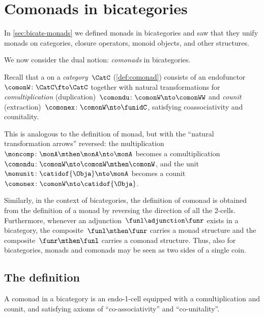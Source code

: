 
\section{Comonads in bicategories}
\label{sec:bicats-comonads}

In \cref{sec:bicats-monads} we defined monads in bicategories and saw that they unify monads on categories, closure operators, monoid objects, and other structures.

We now consider the dual notion: \emph{comonads} in bicategories. 

Recall that a  on a \emph{category}~$\CatC$ (\cref{def:comonad}) consists of an endofunctor~$\comonW \colon \CatC \fto \CatC$ together with natural transformations for \emph{comultiplication} (duplication)~$\comondu \colon \comonW \nto \comonWW$ and \emph{counit} (extraction)~$\comonex \colon \comonW \nto \funidC$, satisfying coassociativity and counitality.

This is analogous to the definition of monad, but with the ``natural transformation arrows'' reversed: the multiplication~$\moncomp \colon \monA \mthen \monA \nto \monA$ becomes a comultiplication~$\comondu \colon \comonW \nto \comonW \mthen \comonW$, and the unit~$\monunit \colon \catidof{\Obja} \nto \monA$ becomes a counit~$\comonex \colon \comonW \nto \catidof{\Obja}$.

Similarly, in the context of bicategories, the definition of comonad is obtained from the definition of a monad by reversing the direction of all the 2-cells.
Furthermore, whenever an adjunction~$\funl \adjunction \funr$ exists in a bicategory, the composite~$\funl \mthen \funr$ carries a monad structure and the composite~$\funr \mthen \funl$ carries a comonad structure. Thus, also for bicategories, monads and comonads may be seen as two sides of a single coin.

\subsection{The definition}

A comonad in a bicategory is an endo-1-cell equipped with a comultiplication and counit, and satisfying axioms of ``co-associativity'' and ``co-unitality''.

